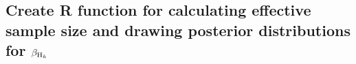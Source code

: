 \documentclass[
]{article}
\newenvironment{Shaded}{\begin{snugshade}}{\end{snugshade}}
\newcommand{\AttributeTok}[1]{\textcolor[rgb]{0.13,0.29,0.53}{#1}}
\newcommand{\ConstantTok}[1]{\textcolor[rgb]{0.56,0.35,0.01}{#1}}
\newcommand{\ControlFlowTok}[1]{\textcolor[rgb]{0.13,0.29,0.53}{\textbf{#1}}}
\newcommand{\DecValTok}[1]{\textcolor[rgb]{0.00,0.00,0.81}{#1}}
\newcommand{\FloatTok}[1]{\textcolor[rgb]{0.00,0.00,0.81}{#1}}
\newcommand{\FunctionTok}[1]{\textcolor[rgb]{0.13,0.29,0.53}{\textbf{#1}}}
\newcommand{\NormalTok}[1]{#1}
\newcommand{\OtherTok}[1]{\textcolor[rgb]{0.56,0.35,0.01}{#1}}
\newcommand{\SpecialCharTok}[1]{\textcolor[rgb]{0.81,0.36,0.00}{\textbf{#1}}}
\newcommand{\StringTok}[1]{\textcolor[rgb]{0.31,0.60,0.02}{#1}}
\begin{document}
\hypertarget{create-r-function-for-calculating-effective-sample-size-and-drawing-posterior-distributions-for-beta_rm-h_k}{%
\subsection{\texorpdfstring{Create R function for calculating effective
sample size and drawing posterior distributions for
\(\beta_{{\rm H}_k}\)}{Create R function for calculating effective sample size and drawing posterior distributions for \textbackslash beta\_\{\{\textbackslash rm H\}\_k\}}}\label{create-r-function-for-calculating-effective-sample-size-and-drawing-posterior-distributions-for-beta_rm-h_k}}

\begin{Shaded}
\end{Shaded}
\end{document}
